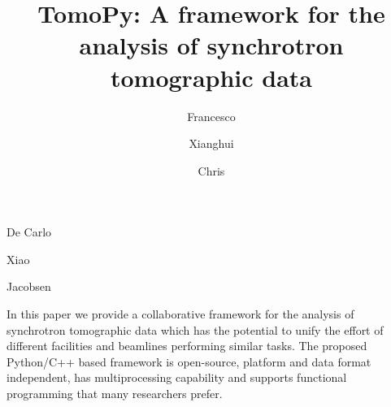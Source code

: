 \documentclass[pdf]{iucr}              %
\begin{document}



\title{TomoPy: A framework for the analysis of synchrotron tomographic data}


\author{Francesco}{De Carlo}
\author{Xianghui}{Xiao}
\author{Chris}{Jacobsen}







\maketitle                        %

\begin{synopsis}
In this paper we provide a collaborative framework for the analysis of synchrotron tomographic data which has the potential to unify the effort of different facilities and beamlines performing similar tasks. The proposed Python/C++ based framework is open-source, platform and data format independent, has multiprocessing capability and supports functional programming that many researchers prefer. 
\end{synopsis}
\end{document}
